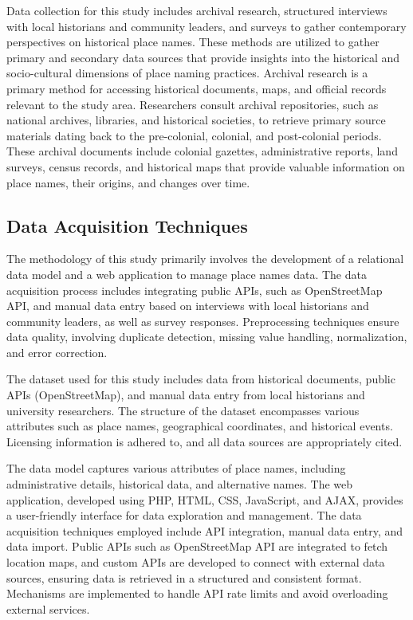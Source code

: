 Data collection for this study includes archival research, structured interviews with local historians and community leaders, and surveys to gather contemporary perspectives on historical place names. These methods are utilized to gather primary and secondary data sources that provide insights into the historical and socio-cultural dimensions of place naming practices. Archival research is a primary method for accessing historical documents, maps, and official records relevant to the study area. Researchers consult archival repositories, such as national archives, libraries, and historical societies, to retrieve primary source materials dating back to the pre-colonial, colonial, and post-colonial periods. These archival documents include colonial gazettes, administrative reports, land surveys, census records, and historical maps that provide valuable information on place names, their origins, and changes over time.

\subsection{Data Acquisition Techniques}

The methodology of this study primarily involves the development of a relational data model and a web application to manage place names data. The data acquisition process includes integrating public APIs, such as OpenStreetMap API, and manual data entry based on interviews with local historians and community leaders, as well as survey responses. Preprocessing techniques ensure data quality, involving duplicate detection, missing value handling, normalization, and error correction.

The dataset used for this study includes data from historical documents, public APIs (OpenStreetMap), and manual data entry from local historians and university researchers. The structure of the dataset encompasses various attributes such as place names, geographical coordinates, and historical events. Licensing information is adhered to, and all data sources are appropriately cited.

The data model captures various attributes of place names, including administrative details, historical data, and alternative names. The web application, developed using PHP, HTML, CSS, JavaScript, and AJAX, provides a user-friendly interface for data exploration and management. The data acquisition techniques employed include API integration, manual data entry, and data import. Public APIs such as OpenStreetMap API are integrated to fetch location maps, and custom APIs are developed to connect with external data sources, ensuring data is retrieved in a structured and consistent format. Mechanisms are implemented to handle API rate limits and avoid overloading external services.

